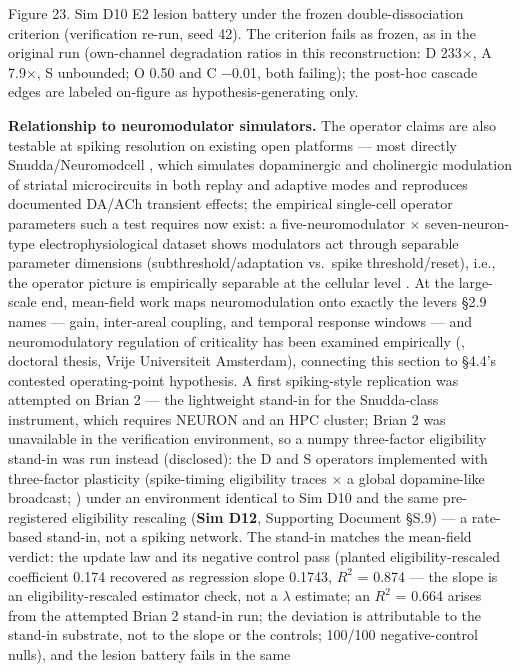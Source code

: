 \documentclass[
]{article}
\begin{document}
Figure 23. Sim D10 E2 lesion battery under the frozen
double-dissociation criterion (verification re-run, seed 42). The
criterion fails as frozen, as in the original run (own-channel
degradation ratios in this reconstruction: D {233×}, A {7.9×}, S
unbounded; O 0.50 and C {−0.01}, both failing); the post-hoc cascade
edges are labeled on-figure as hypothesis-generating only.

\textbf{Relationship to neuromodulator simulators.} The operator claims
are also testable at spiking resolution on existing open platforms ---
most directly Snudda/Neuromodcell , which simulates dopaminergic and
cholinergic modulation of striatal microcircuits in both replay and
adaptive modes and reproduces documented DA/ACh transient effects; the
empirical single-cell operator parameters such a test requires now
exist: a five-neuromodulator \(\times\) seven-neuron-type
electrophysiological dataset shows modulators act through separable
parameter dimensions (subthreshold/adaptation vs.~spike
threshold/reset), i.e., the operator picture is empirically separable at
the cellular level . At the large-scale end, mean-field work maps
neuromodulation onto exactly the levers §2.9 names --- gain, inter-areal
coupling, and temporal response windows --- and neuromodulatory
regulation of criticality has been examined empirically (, doctoral
thesis, Vrije Universiteit Amsterdam), connecting this section to §4.4's
contested operating-point hypothesis. A first spiking-style replication
was attempted on Brian 2 --- the lightweight stand-in for the
Snudda-class instrument, which requires NEURON and an HPC cluster; Brian
2 was unavailable in the verification environment, so a numpy
three-factor eligibility stand-in was run instead (disclosed): the D and
S operators implemented with three-factor plasticity (spike-timing
eligibility traces \(\times\) a global dopamine-like broadcast; ) under
an environment identical to Sim D10 and the same pre-registered
eligibility rescaling (\textbf{Sim D12}, Supporting Document §S.9) --- a
rate-based stand-in, not a spiking network. The stand-in matches the
mean-field verdict: the update law and its negative control pass
(planted eligibility-rescaled coefficient 0.174 recovered as regression
slope 0.1743, \(R^{2}\) = 0.874 --- the slope is an eligibility-rescaled
estimator check, not a \(\lambda\) estimate; an \(R^{2}\) = 0.664 arises
from the attempted Brian 2 stand-in run; the deviation is attributable
to the stand-in substrate, not to the slope or the controls; 100/100
negative-control nulls), and the lesion battery fails in the same
\end{document}
